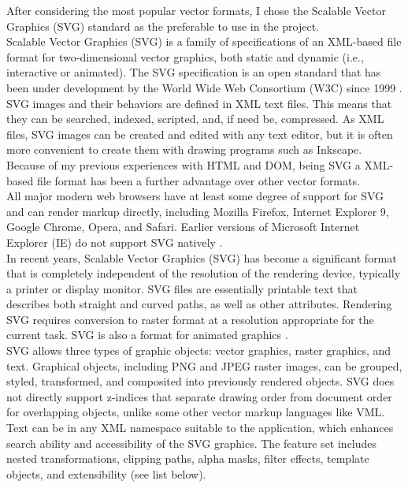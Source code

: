 \documentclass[]{usiinfbachelorproject}
\begin{document}
\noindent After considering the most popular vector formats, I chose the Scalable Vector Graphics (SVG) standard as the preferable to use in the project.\\
Scalable Vector Graphics (SVG) is a family of specifications of an XML-based file format for two-dimensional vector graphics, both static and dynamic (i.e., interactive or animated). The SVG specification is an open standard that has been under development by the World Wide Web Consortium (W3C) since 1999 \cite{Wiki:formats}.\\
SVG images and their behaviors are defined in XML text files. This means that they can be searched, indexed, scripted, and, if need be, compressed. As XML files, SVG images can be created and edited with any text editor, but it is often more convenient to create them with drawing programs such as Inkscape. Because of my previous experiences with HTML and DOM, being SVG a XML-based file format has been a further advantage over other vector formats.\\
All major modern web browsers have at least some degree of support for SVG and can render markup directly, including Mozilla Firefox, Internet Explorer 9, Google Chrome, Opera, and Safari. Earlier versions of Microsoft Internet Explorer (IE) do not support SVG natively \cite{Wiki:svg}.\\
In recent years, Scalable Vector Graphics (SVG) has become a significant format that is completely independent of the resolution of the rendering device, typically a printer or display monitor. SVG files are essentially printable text that describes both straight and curved paths, as well as other attributes. Rendering SVG requires conversion to raster format at a resolution appropriate for the current task. SVG is also a format for animated graphics \cite{Wiki:vector}.\\
SVG allows three types of graphic objects: vector graphics, raster graphics, and text. Graphical objects, including PNG and JPEG raster images, can be grouped, styled, transformed, and composited into previously rendered objects. SVG does not directly support z-indices that separate drawing order from document order for overlapping objects, unlike some other vector markup languages like VML. Text can be in any XML namespace suitable to the application, which enhances search ability and accessibility of the SVG graphics. The feature set includes nested transformations, clipping paths, alpha masks, filter effects, template objects, and extensibility (see list below).\\
\end{document}
